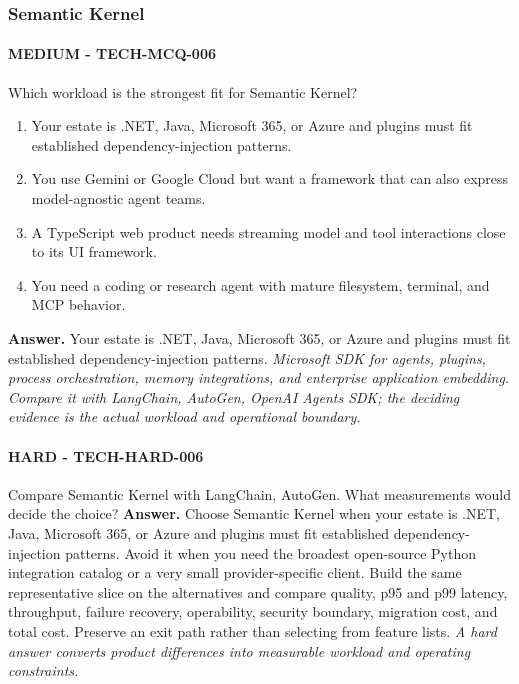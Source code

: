 \subsubsection*{Semantic Kernel}
\paragraph{MEDIUM - TECH-MCQ-006} Which workload is the strongest fit for Semantic Kernel?
\begin{enumerate}[label=\Alph*.]
\item Your estate is .NET, Java, Microsoft 365, or Azure and plugins must fit established dependency-injection patterns.
\item You use Gemini or Google Cloud but want a framework that can also express model-agnostic agent teams.
\item A TypeScript web product needs streaming model and tool interactions close to its UI framework.
\item You need a coding or research agent with mature filesystem, terminal, and MCP behavior.
\end{enumerate}
\textbf{Answer.} Your estate is .NET, Java, Microsoft 365, or Azure and plugins must fit established dependency-injection patterns.
\textit{Microsoft SDK for agents, plugins, process orchestration, memory integrations, and enterprise application embedding. Compare it with LangChain, AutoGen, OpenAI Agents SDK; the deciding evidence is the actual workload and operational boundary.}
\paragraph{HARD - TECH-HARD-006} Compare Semantic Kernel with LangChain, AutoGen. What measurements would decide the choice?
\textbf{Answer.} Choose Semantic Kernel when your estate is .NET, Java, Microsoft 365, or Azure and plugins must fit established dependency-injection patterns. Avoid it when you need the broadest open-source Python integration catalog or a very small provider-specific client. Build the same representative slice on the alternatives and compare quality, p95 and p99 latency, throughput, failure recovery, operability, security boundary, migration cost, and total cost. Preserve an exit path rather than selecting from feature lists.
\textit{A hard answer converts product differences into measurable workload and operating constraints.}
